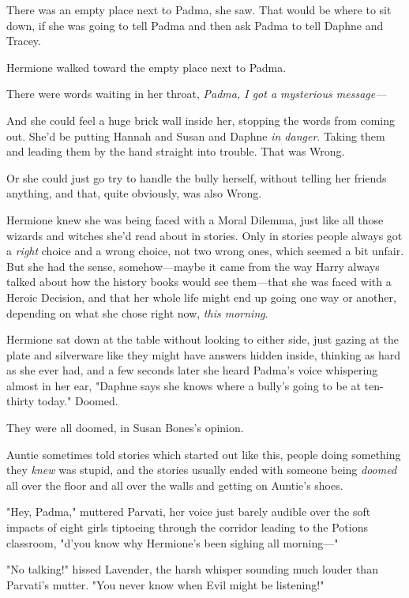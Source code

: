 There was an empty place next to Padma, she saw. That would be where to sit
down, if she was going to tell Padma and then ask Padma to tell Daphne and
Tracey.

Hermione walked toward the empty place next to Padma.

There were words waiting in her throat, \emph{Padma, I got a 
mysterious message---}

And she could feel a huge brick wall inside her, stopping the words from coming
out. She'd be putting Hannah and Susan and Daphne \emph{in danger}. Taking them
and leading them by the hand straight into trouble. That was Wrong.

Or she could just go try to handle the bully herself, without telling her
friends anything, and that, quite obviously, was also Wrong.

Hermione knew she was being faced with a Moral Dilemma, just like all those
wizards and witches she'd read about in stories. Only in stories people always
got a \emph{right} choice and a wrong choice, not two wrong ones, which seemed
a bit unfair. But she had the sense, somehow---maybe it came from the way Harry
always talked about how the history books would see them---that she was faced
with a Heroic Decision, and that her whole life might end up going one way or
another, depending on what she chose right now, \emph{this morning}.

Hermione sat down at the table without looking to either side, just gazing at
the plate and silverware like they might have answers hidden inside, thinking
as hard as she ever had, and a few seconds later she heard Padma's voice
whispering almost in her ear, "Daphne says she knows where a bully's going to
be at ten-thirty today."
\sbreak
Doomed.

They were all doomed, in Susan Bones's opinion.

Auntie sometimes told stories which started out like this, people doing
something they \emph{knew} was stupid, and the stories usually ended with
someone being \emph{doomed} all over the floor and all over the walls and
getting on Auntie's shoes.

"Hey, Padma," muttered Parvati, her voice just barely audible over the soft
impacts of eight girls tiptoeing through the corridor leading to the Potions
classroom, "d'you know why Hermione's been sighing all morning---"

"No talking!" hissed Lavender, the harsh whisper sounding much louder than
Parvati's mutter. "You never know when Evil might be listening!"

